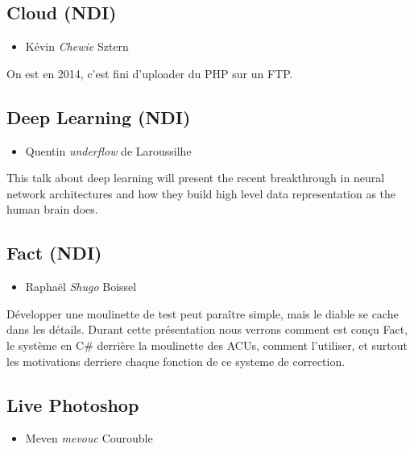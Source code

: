 \documentclass[a4paper]{article}
\begin{document}
\vspace{0.3cm}

\subsection{Cloud (NDI)}
\begin{itemize}
    \item Kévin \emph{Chewie} Sztern
\end{itemize}

On est en 2014, c'est fini d'uploader du PHP sur un FTP.

\vspace{0.3cm}

\subsection{Deep Learning (NDI)}
\begin{itemize}
    \item Quentin \emph{underflow} de Laroussilhe
\end{itemize}

This talk about deep learning will present the recent breakthrough in neural
network architectures and how they build high level data representation as the
human brain does.

\vspace{0.3cm}

\subsection{Fact (NDI)}
\begin{itemize}
    \item Raphaël \emph{Shugo} Boissel
\end{itemize}

Développer une moulinette de test peut paraître simple, mais le diable se cache
dans les détails. Durant cette présentation nous verrons comment est conçu
Fact, le système en C\# derrière la moulinette des ACUs, comment l'utiliser, et
surtout les motivations derriere chaque fonction de ce systeme de correction.

\vspace{0.3cm}

\subsection{Live Photoshop}
\begin{itemize}
    \item Meven \emph{mevouc} Courouble
\end{itemize}
\end{document}

